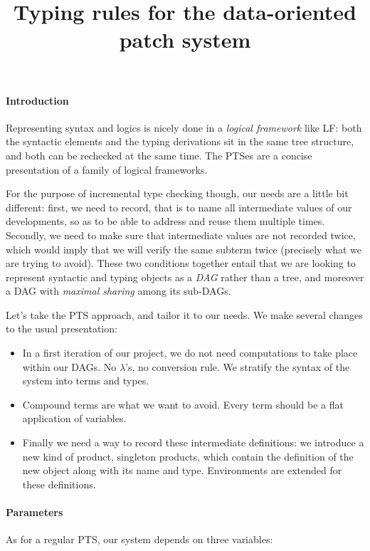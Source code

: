 \documentclass[12pt]{article}
\title{Typing rules for the data-oriented patch system}
\begin{document}
\maketitle

\paragraph{Introduction}

Representing syntax and logics is nicely done in a \emph{logical
  framework} like LF: both the syntactic elements and the typing
derivations sit in the same tree structure, and both can be rechecked
at the same time. The PTSes are a concise presentation of a family of
logical frameworks.

For the purpose of incremental type checking though, our needs are a
little bit different: first, we need to record, that is to name all
intermediate values of our developments, so as to be able to address
and reuse them multiple times. Secondly, we need to make sure that
intermediate values are not recorded twice, which would imply that we
will verify the same subterm twice (precisely what we are trying to
avoid). These two conditions together entail that we are looking to
represent syntactic and typing objects as a \emph{DAG} rather than a
tree, and moreover a DAG with \emph{maximal sharing} among its
sub-DAGs.

Let's take the PTS approach, and tailor it to our needs. We make
several changes to the usual presentation:
\begin{itemize}
\item In a first iteration of our project, we do not need computations
  to take place within our DAGs. No $\lambda$'s, no conversion
  rule. We stratify the syntax of the system into terms and types.
\item Compound terms are what we want to avoid. Every term should be a
  flat application of variables. 
\item Finally we need a way to record these intermediate definitions:
  we introduce a new kind of product, singleton products, which
  contain the definition of the new object along with its name and
  type. Environments are extended for these definitions.
\end{itemize}

\paragraph{Parameters}

As for a regular PTS, our system depends on three variables:
\end{document}
